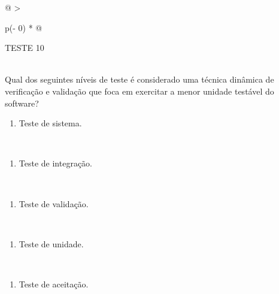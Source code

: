 \documentclass[
]{book}
\providecommand{\tightlist}{%
  \setlength{\itemsep}{0pt}\setlength{\parskip}{0pt}}
\begin{document}
\begin{longtable}[]{@{}
  >{\raggedright\arraybackslash}p{(\columnwidth - 0\tabcolsep) * }@{}}
\toprule\noalign{}
\begin{minipage}[b]{\linewidth}\raggedright
TESTE 10
\end{minipage} \\
\midrule\noalign{}
\endhead
\bottomrule\noalign{}
\endlastfoot
Qual dos seguintes níveis de teste é considerado uma técnica dinâmica de verificação e validação que foca em exercitar a menor unidade testável do software? \\
\begin{minipage}[t]{\linewidth}\raggedright
\begin{enumerate}
\def\labelenumi{\Alph{enumi})}
\tightlist
\item
  Teste de sistema.
\end{enumerate}
\end{minipage} \\
\begin{minipage}[t]{\linewidth}\raggedright
\begin{enumerate}
\def\labelenumi{\Alph{enumi})}
\setcounter{enumi}{1}
\tightlist
\item
  Teste de integração.
\end{enumerate}
\end{minipage} \\
\begin{minipage}[t]{\linewidth}\raggedright
\begin{enumerate}
\def\labelenumi{\Alph{enumi})}
\setcounter{enumi}{2}
\tightlist
\item
  Teste de validação.
\end{enumerate}
\end{minipage} \\
\begin{minipage}[t]{\linewidth}\raggedright
\begin{enumerate}
\def\labelenumi{\Alph{enumi})}
\setcounter{enumi}{3}
\tightlist
\item
  Teste de unidade.
\end{enumerate}
\end{minipage} \\
\begin{minipage}[t]{\linewidth}\raggedright
\begin{enumerate}
\def\labelenumi{\Alph{enumi})}
\setcounter{enumi}{4}
\tightlist
\item
  Teste de aceitação.
\end{enumerate}
\end{minipage} \\
\end{longtable}
\end{document}
